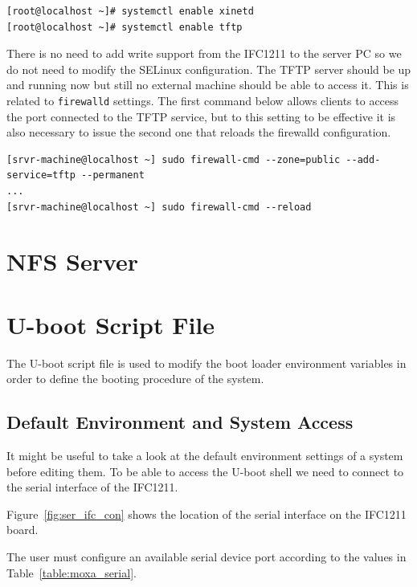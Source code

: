 \documentclass[11pt
  , a4paper
  , article
  , oneside
  , showtrims
]{memoir}
\begin{document}
\begin{lstlisting}[style=termstyle]
[root@localhost ~]# systemctl enable xinetd
[root@localhost ~]# systemctl enable tftp
\end{lstlisting}

There is no need to add write support from the IFC1211 to the server PC so we do not need to modify the SELinux configuration.
The TFTP server should be up and running now but still no external machine should be able to access it. This is related to \texttt{firewalld} settings. 
The first command below allows clients to access the port connected to the TFTP service, but to this setting to be effective it is also necessary to issue the second one that reloads the firewalld configuration.

\begin{lstlisting}[style=termstyle]
[srvr-machine@localhost ~] sudo firewall-cmd --zone=public --add-service=tftp --permanent
...
[srvr-machine@localhost ~] sudo firewall-cmd --reload
\end{lstlisting}


\section{NFS Server}
\fi

\section{U-boot Script File}
The U-boot script file is used to modify the boot loader environment variables in order to define the booting procedure of the system.

\subsection{Default Environment and System Access}
It might be useful to take a look at the default environment settings of a system before editing them. To be able to access the U-boot shell we need to connect to the serial interface of the IFC1211.

Figure~\ref{fig:ser_ifc_con} shows the location of the serial interface on the IFC1211 board.

The user must configure an available serial device port according to the values in Table~\ref{table:moxa_serial}.
\end{document}
